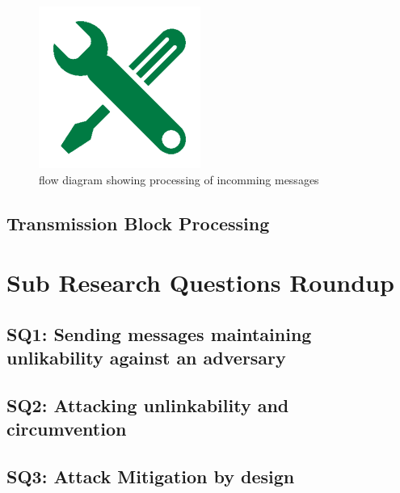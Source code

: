 \begin{figure}[hbt]
	\includegraphics[width=\textwidth]{inc/fixme}
	\caption{flow diagram showing processing of incomming messages}
	\label{fig:msgRecvProcessing}
\end{figure}


\subsection{Transmission Block Processing}

\section{Sub Research Questions Roundup}
\subsection{SQ1: Sending messages maintaining unlikability against an adversary}
\subsection{SQ2: Attacking unlinkability and circumvention}
\subsection{SQ3: Attack Mitigation by design}

